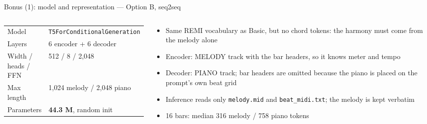 \documentclass[aspectratio=169,11pt]{beamer}
\newenvironment{tight}{\begin{itemize}\setlength{\itemsep}{1.5pt}\setlength{\parskip}{0pt}\setlength{\topsep}{0pt}}{\end{itemize}}
\begin{document}
\begin{frame}[t]{Bonus (1): model and representation --- Option B, seq2seq}
  \vspace{0.6em}
  \begin{columns}[T]
    \begin{column}{0.5\textwidth}
      \footnotesize
      \begin{tabular}{@{}ll@{}}
        \toprule
        Model & \texttt{T5ForConditionalGeneration} \\
        Layers & 6 encoder + 6 decoder \\
        Width / heads / FFN & 512 / 8 / 2{,}048 \\
        Max length & 1{,}024 melody / 2{,}048 piano \\
        Parameters & \textbf{44.3 M}, random init \\
        \bottomrule
      \end{tabular}
    \end{column}
    \begin{column}{0.5\textwidth}
      \footnotesize
      \begin{tight}
        \item Same REMI vocabulary as Basic, but no chord tokens: the harmony must come from the melody alone
        \item Encoder: MELODY track with the bar headers, so it knows meter and tempo
        \item Decoder: PIANO track; bar headers are omitted because the piano is placed on the prompt's own beat grid
        \item Inference reads only \texttt{melody.mid} and \texttt{beat\_midi.txt}; the melody is kept verbatim
        \item 16 bars: median 316 melody / 758 piano tokens
      \end{tight}
    \end{column}
  \end{columns}
\end{frame}
\end{document}
